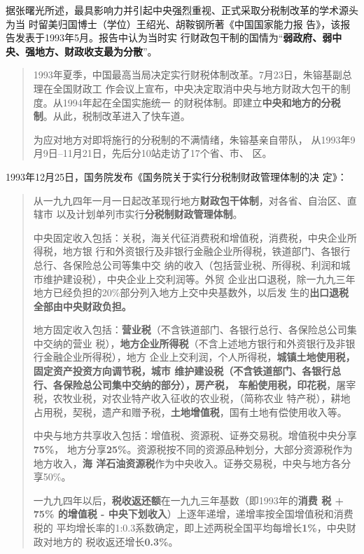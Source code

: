 据张曙光所述，最具影响力并引起中央强烈重视、正式采取分税制改革的学术源头为当
时留美归国博士（学位）王绍光、胡鞍钢所著《中国国家能力报
告》，该报告发表于1993年5月。报告中认为当时实
行财政包干制的国情为“\textbf{弱政府、弱中央、强地方、财政收支最为分散}”。

\begin{quotation}
  1993年夏季，中国最高当局决定实行财税体制改革。7月23日，朱镕基副总理在全国财政工
  作会议上宣布，中央决定取消中央与地方财政大包干的制度。从1994年起在全国实施统一
  的财税体制。即建立\textbf{中央和地方的分税制}。从此，税制改革进入了快车道。

  为应对地方对即将施行的分税制的不满情绪，朱镕基亲自带队，
  从1993年9月9日--11月21日，先后分10站走访了17个省、市、
  区。
\end{quotation}

1993年12月25日，国务院发布《国务院关于实行分税制财政管理体制的决
定》：

\begin{quotation}
  从一九九四年一月一日起改革现行地方\textbf{财政包干体制}，对各省、自治区、直辖市
  以及计划单列市实行\textbf{分税制财政管理体制}。

  中央固定收入包括：关税，海关代征消费税和增值税，消费税，中央企业所得税，地方银
  行和外资银行及非银行金融企业所得税，铁道部门、各银行总行、各保险总公司等集中交
  纳的收入（包括营业税、所得税、利润和城市维护建设税），中央企业上交利润等。外贸
  企业出口退税，除一九九三年地方已经负担的20\%部分列入地方上交中央基数外，以后发
  生的\textbf{出口退税全部由中央财政负担。}

  地方固定收入包括：\textbf{营业税}（不含铁道部门、各银行总行、各保险总公司集中交纳的营业
  税），\textbf{地方企业所得税}（不含上述地方银行和外资银行及非银行金融企业所得税），地方
  企业上交利润，个人所得税，\textbf{城镇土地使用税，固定资产投资方向调节税，城市
    维护建设税（不含铁道部门、各银行总行、各保险总公司集中交纳的部分），房产税，
    车船使用税，印花税}，屠宰税，农牧业税，对农业特产收入征收的农业税，（简称农业
  特产税），耕地占用税，契税，遗产和赠予税，\textbf{土地增值税}，国有土地有偿使用收入等。

  中央与地方共享收入包括：增值税、资源税、证券交易税。增值税中央分享\textbf{75\%}，
  地方分享\textbf{25\%}。资源税按不同的资源品种划分，大部分资源税作为地方收入，\textbf{海
    洋石油资源税}作为中央收入。证券交易税，中央与地方各分享50\%。

  一九九四年以后，\textbf{税收返还额}在一九九三年基数（即1993年的\textbf{消费
    税 + 75\% 的增值税 - 中央下划收入}）上逐年递增，递增率按全国增值税和消费税的
  平均增长率的1:0.3系数确定，即上述两税全国平均每增长\textbf{1\%}，中央财政对地方的
  税收返还增长\textbf{0.3\%}。
\end{quotation}

